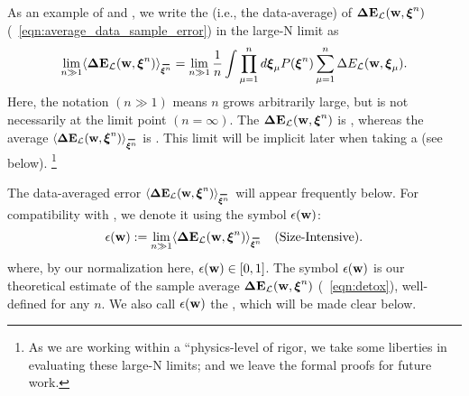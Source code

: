 As an example of \SizeExtensivity and \SizeIntensivity, 
we write the \ExpectedValue (i.e., the data-average) of \DataSampleError $\mathbf{\Delta {E}}_{\mathcal{L}}(\mathbf{w}, \boldsymbol{\xi}^{n})$ (\EQN~\ref{eqn:average_data_sample_error})
in the large-N limit as
\begin{align}
  \lim_{n\gg 1} 
  \langle \DETOPXI\rangle_{\AVGNDXIn}=
  \lim_{n\gg 1}\frac{1}{n}
\int \prod_{\mu=1}^{n}d\XI_{\mu}P(\NDXIn)
  \sum_{\mu=1}^{n}\Delta E_{\mathcal{L}}(\WVEC,\XI_{\mu}) .
\end{align}
Here, the notation $(n \gg 1)$ means $n$ grows arbitrarily large, but is not necessarily
at the limit point $(n=\infty)$.
The \TotalDataSampleError $\mathbf{\Delta {E}}_{\mathcal{L}}(\mathbf{w}, \boldsymbol{\xi}^{n})$ is \SizeExtensive, whereas the
average $\langle\DETOPXI\rangle_{\AVGNDXIn}$ is \SizeIntensive.
This limit will be implicit later when taking a \SaddlePointApproximation (see below).
\footnote{As we are working within a ``physics-level of rigor, we take some liberties in evaluating these large-N limits; and we leave the formal proofs for future work.  }

The data-averaged error  $\langle \DETOPXI \rangle_{\AVGNDXIn}$ will appear frequently below.
For compatibility with \cite{SST92}, we denote it using the symbol $\epsilon({\mathbf{w}})$:
\begin{align}
 \label{eqn:epsl}
 \EPSLw:=\lim_{n\gg 1}  \langle \DETOPXI \rangle_{\AVGNDXIn} \quad \text{(\SizeIntensive)}.
\end{align}
where, by our normalization here, $\epsilon({\mathbf{w}}) \in [0,1]$.
The symbol $\epsilon({\mathbf{w}})$ is our theoretical estimate of the sample average $\mathbf{\Delta {E}}_{\mathcal{L}}(\mathbf{w}, \boldsymbol{\xi}^{n})$ (\EQN~\ref{eqn:detox}),
well-defined for any $n$.
We also call $\epsilon({\mathbf{w}})$ the \emph{\EffectivePotential}, which will be made clear below.

